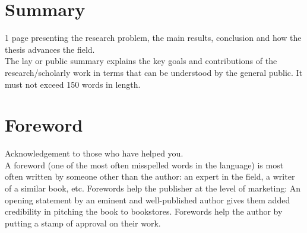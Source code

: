 \chapter*{Summary}
  1 page presenting the research problem, the main results, conclusion and how the thesis advances 
  the field. \\
  The lay or public summary explains the key goals and contributions of the research/scholarly work 
  in terms that can be understood by the general public. It must not exceed 150 words in length.

\chapter*{Foreword}
  Acknowledgement to those who have helped you. \\
  A foreword (one of the most often misspelled words in the language) is most often written by 
    someone other than the author: an expert in the field, a writer of a similar book, etc. 
    Forewords help the publisher at the level of marketing: An opening statement by an eminent and 
    well-published author gives them added credibility in pitching the book to bookstores. Forewords 
    help the author by putting a stamp of approval on their work.

